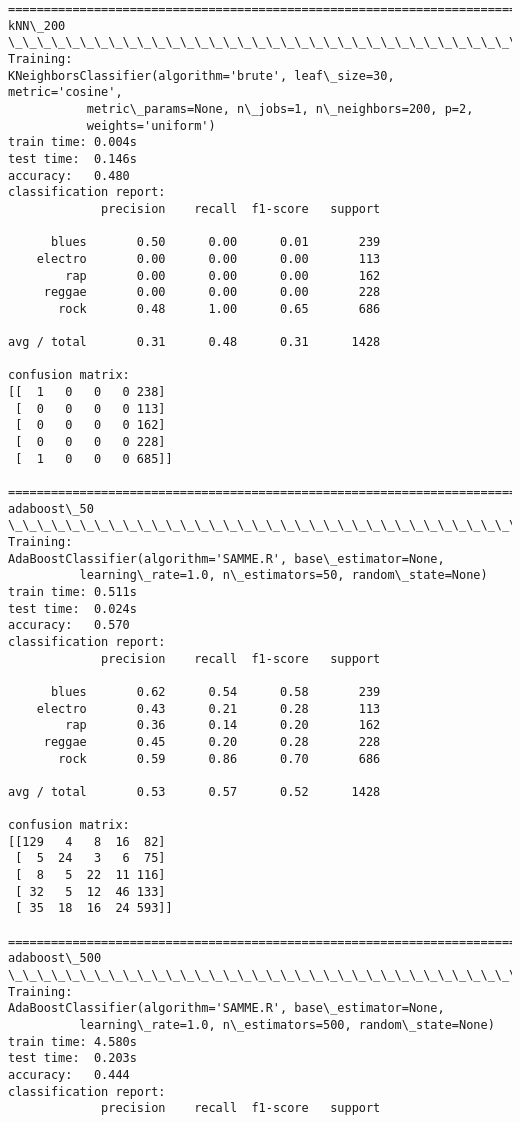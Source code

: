 \documentclass[11pt]{article}
\begin{document}
\begin{Verbatim}[commandchars=\\\{\}]
================================================================================
kNN\_200
\_\_\_\_\_\_\_\_\_\_\_\_\_\_\_\_\_\_\_\_\_\_\_\_\_\_\_\_\_\_\_\_\_\_\_\_\_\_\_\_\_\_\_\_\_\_\_\_\_\_\_\_\_\_\_\_\_\_\_\_\_\_\_\_\_\_\_\_\_\_\_\_\_\_\_\_\_\_\_\_
Training: 
KNeighborsClassifier(algorithm='brute', leaf\_size=30, metric='cosine',
           metric\_params=None, n\_jobs=1, n\_neighbors=200, p=2,
           weights='uniform')
train time: 0.004s
test time:  0.146s
accuracy:   0.480
classification report:
             precision    recall  f1-score   support

      blues       0.50      0.00      0.01       239
    electro       0.00      0.00      0.00       113
        rap       0.00      0.00      0.00       162
     reggae       0.00      0.00      0.00       228
       rock       0.48      1.00      0.65       686

avg / total       0.31      0.48      0.31      1428

confusion matrix:
[[  1   0   0   0 238]
 [  0   0   0   0 113]
 [  0   0   0   0 162]
 [  0   0   0   0 228]
 [  1   0   0   0 685]]

================================================================================
adaboost\_50
\_\_\_\_\_\_\_\_\_\_\_\_\_\_\_\_\_\_\_\_\_\_\_\_\_\_\_\_\_\_\_\_\_\_\_\_\_\_\_\_\_\_\_\_\_\_\_\_\_\_\_\_\_\_\_\_\_\_\_\_\_\_\_\_\_\_\_\_\_\_\_\_\_\_\_\_\_\_\_\_
Training: 
AdaBoostClassifier(algorithm='SAMME.R', base\_estimator=None,
          learning\_rate=1.0, n\_estimators=50, random\_state=None)
train time: 0.511s
test time:  0.024s
accuracy:   0.570
classification report:
             precision    recall  f1-score   support

      blues       0.62      0.54      0.58       239
    electro       0.43      0.21      0.28       113
        rap       0.36      0.14      0.20       162
     reggae       0.45      0.20      0.28       228
       rock       0.59      0.86      0.70       686

avg / total       0.53      0.57      0.52      1428

confusion matrix:
[[129   4   8  16  82]
 [  5  24   3   6  75]
 [  8   5  22  11 116]
 [ 32   5  12  46 133]
 [ 35  18  16  24 593]]

================================================================================
adaboost\_500
\_\_\_\_\_\_\_\_\_\_\_\_\_\_\_\_\_\_\_\_\_\_\_\_\_\_\_\_\_\_\_\_\_\_\_\_\_\_\_\_\_\_\_\_\_\_\_\_\_\_\_\_\_\_\_\_\_\_\_\_\_\_\_\_\_\_\_\_\_\_\_\_\_\_\_\_\_\_\_\_
Training: 
AdaBoostClassifier(algorithm='SAMME.R', base\_estimator=None,
          learning\_rate=1.0, n\_estimators=500, random\_state=None)
train time: 4.580s
test time:  0.203s
accuracy:   0.444
classification report:
             precision    recall  f1-score   support


\end{Verbatim}
\end{document}
